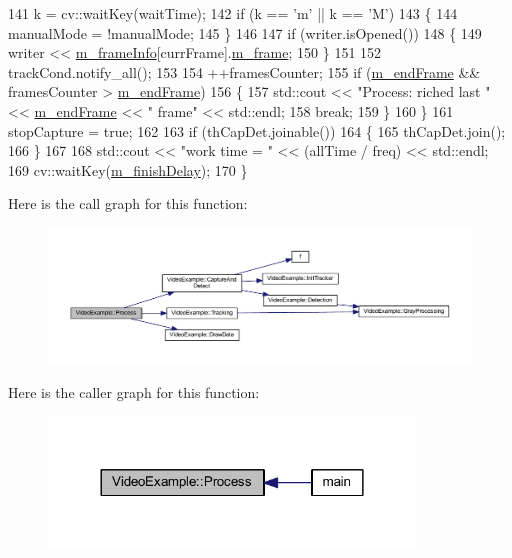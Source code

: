 \begin{DoxyCode}
141         k = cv::waitKey(waitTime);
142         \textcolor{keywordflow}{if} (k == \textcolor{charliteral}{'m'} || k == \textcolor{charliteral}{'M'})
143         \{
144             manualMode = !manualMode;
145         \}
146 
147         \textcolor{keywordflow}{if} (writer.isOpened())
148         \{
149             writer << \mbox{\hyperlink{class_video_example_af5363ad3ed9a34bd105dbdaf274acb66}{m\_frameInfo}}[currFrame].\mbox{\hyperlink{struct_video_example_1_1_frame_info_ace63373cca952f2c7f281b18220f9f8c}{m\_frame}};
150         \}
151 
152         trackCond.notify\_all();
153 
154         ++framesCounter;
155         \textcolor{keywordflow}{if} (\mbox{\hyperlink{class_video_example_ae44e854b8a76b3d4f6393582afd70e67}{m\_endFrame}} && framesCounter > \mbox{\hyperlink{class_video_example_ae44e854b8a76b3d4f6393582afd70e67}{m\_endFrame}})
156         \{
157             std::cout << \textcolor{stringliteral}{"Process: riched last "} << \mbox{\hyperlink{class_video_example_ae44e854b8a76b3d4f6393582afd70e67}{m\_endFrame}} << \textcolor{stringliteral}{" frame"} << std::endl;
158             \textcolor{keywordflow}{break};
159         \}
160     \}
161     stopCapture = \textcolor{keyword}{true};
162 
163     \textcolor{keywordflow}{if} (thCapDet.joinable())
164     \{
165         thCapDet.join();
166     \}
167 
168     std::cout << \textcolor{stringliteral}{"work time = "} << (allTime / freq) << std::endl;
169     cv::waitKey(\mbox{\hyperlink{class_video_example_ac21a646c343edd4c11db034fa2c8c085}{m\_finishDelay}});
170 \}
\end{DoxyCode}
Here is the call graph for this function\+:
\nopagebreak
\begin{figure}[H]
\begin{center}
\leavevmode
\includegraphics[width=350pt]{class_video_example_a87efc66a82c36ad3380623d30a12abf2_cgraph}
\end{center}
\end{figure}
Here is the caller graph for this function\+:
\nopagebreak
\begin{figure}[H]
\begin{center}
\leavevmode
\includegraphics[width=276pt]{class_video_example_a87efc66a82c36ad3380623d30a12abf2_icgraph}
\end{center}
\end{figure}
